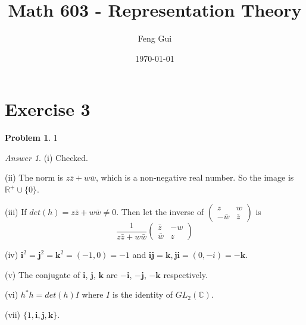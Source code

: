 \documentclass[10pt,a4paper]{article}
\theoremstyle{plain}
\theoremstyle{definition}
\newtheorem*{problem*}{Problem}
\theoremstyle{remark}
\newtheorem*{answer*}{Answer}
\newcommand{\IC}{\mathbb{C}}
\newcommand{\IR}{\mathbb{R}}
\newcommand{\<}{\langle}
\renewcommand{\>}{\rangle}
\newcommand{\subtitle}[1]{%
  \posttitle{%
    \par\end{center}
    \begin{center}\large#1\end{center}
    \vskip0.5em}%
}
\begin{document}
%

\title{Math 603 - Representation Theory}
\subtitle{Homework 5}
\author{Feng Gui}
\date{\today}



\pagestyle{plain}

\makeatletter
\let\runlhead\@author
\let\runrhead\@title
\makeatother

\renewcommand{\headrulewidth}{1.5pt}
\lhead{\runlhead} %
\chead{}
\rhead{\runrhead}

\lfoot{}
\cfoot{}


\maketitle


\section*{Exercise 3}
\label{sec:Exercise 3}


\begin{problem*}1
\end{problem*}

\begin{answer*} \hfill

(i) Checked.

(ii) The norm is $z\bar{z}+w\bar{w}$, which is a non-negative real number. So the image is $\IR^+\cup \{0\}$.

(iii) If $det(h) = z\bar{z}+w\bar{w} \not = 0$. Then let the inverse of $\begin{pmatrix}z & w \\ -\bar{w} & \bar{z} \end{pmatrix}$ is
\[\frac{1}{z\bar{z}+w\bar{w}}\begin{pmatrix} \bar{z} & -w \\ \bar{w} & z \end{pmatrix}\]

(iv) $\mathbf{i}^2 = \mathbf{j}^2 = \mathbf{k}^2 = (-1, 0) = -1$ and $\mathbf{ij} = \mathbf{k}, \mathbf{ji} = (0, -i) = -\mathbf{k}$.

(v) The conjugate of $\mathbf{i}$, $\mathbf{j}$, $\mathbf{k}$ are $-\mathbf{i}$, $-\mathbf{j}$,  $-\mathbf{k}$ respectively.

(vi) $h^*h= det(h)I$ where $I$ is the identity of $GL_2(\IC)$.

(vii) $\{1,\mathbf{i},\mathbf{j},\mathbf{k}\}$.\\

\end{answer*}
\end{document}
